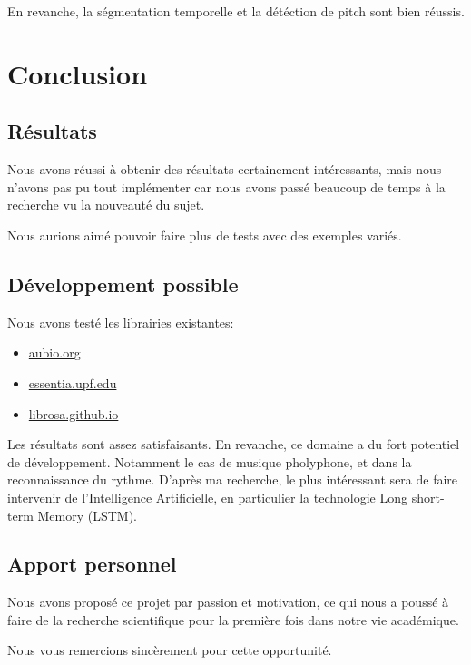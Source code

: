 \documentclass[]{article}
\providecommand{\tightlist}{%
  \setlength{\itemsep}{0pt}\setlength{\parskip}{0pt}}
\begin{document}
En revanche, la ségmentation temporelle et la détéction de pitch sont
bien réussis.

\pagebreak

\hypertarget{conclusion}{%
\section{Conclusion}\label{conclusion}}

\hypertarget{resultats-1}{%
\subsection{Résultats}\label{resultats-1}}

Nous avons réussi à obtenir des résultats certainement intéressants,
mais nous n'avons pas pu tout implémenter car nous avons passé beaucoup
de temps à la recherche vu la nouveauté du sujet.

Nous aurions aimé pouvoir faire plus de tests avec des exemples variés.

\hypertarget{developpement-possible}{%
\subsection{Développement possible}\label{developpement-possible}}

Nous avons testé les librairies existantes:

\begin{itemize}
\tightlist
\item
  \url{aubio.org}
\item
  \url{essentia.upf.edu}
\item
  \url{librosa.github.io}
\end{itemize}

Les résultats sont assez satisfaisants. En revanche, ce domaine a du
fort potentiel de développement. Notamment le cas de musique pholyphone,
et dans la reconnaissance du rythme. D'après ma recherche, le plus
intéressant sera de faire intervenir de l'Intelligence Artificielle, en
particulier la technologie Long short-term Memory (LSTM). \citep{lstm}

\hypertarget{apport-personnel}{%
\subsection{Apport personnel}\label{apport-personnel}}

Nous avons proposé ce projet par passion et motivation, ce qui nous a
poussé à faire de la recherche scientifique pour la première fois dans
notre vie académique.

Nous vous remercions sincèrement pour cette opportunité.

\pagebreak

\renewcommand\refname{Références}

\end{document}
